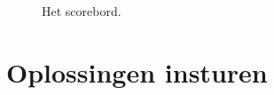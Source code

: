 \begin{figure}[p]
  \centering
  \caption{Het scorebord.}
  \label{fig:team-scoreboard}
\end{figure}

\newpage

\section{Oplossingen insturen}\label{submit}

